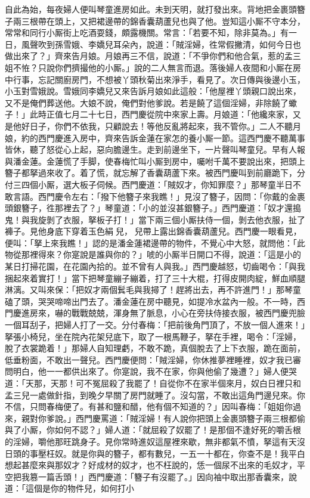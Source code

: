 自此為始，每夜婦人便叫琴童進房如此。未到天明，就打發出來。背地把金裹頭簪子兩三根帶在頭上，又把裙邊帶的錦香囊葫蘆兒也與了他。豈知這小厮不守本分，常常和同行小厮街上吃酒耍錢，頗露機關。常言：「若要不知，除非莫為。」有一日，風聲吹到孫雪娥、李嬌兒耳朵內，說道：「賊淫婦，徃常假撇清，如何今日也做出來了？」齊來告月娘。月娘再三不信，{}說道：「不爭你們和他合氣，惹的孟三姐不恠？只說你們擠撮他的小厮。」說的二人無言而退。落後婦人夜間和小厮在房中行事，忘記關廚房門，不想被丫頭秋菊出來淨手，看見了。次日傳與後邊小玉，小玉對雪娥說。雪娥同李嬌兒又來告訴月娘如此這般：「他屋裡丫頭親口說出來，又不是俺們葬送他。大娘不說，俺們對他爹說。若是饒了這個淫婦，非除饒了蠍子！」此時正值七月二十七日，西門慶從院中來家上壽。月娘道：「他纔來家，又是他好日子，你們不依我，只顧說去！等他反亂將起來，我不管你。」二人不聽月娘，約的西門慶進入房中，齊來告訴金蓮在家怎的養小厮一節。這西門慶不聽萬事皆休，聽了怒從心上起，惡向膽邊生。走到前邊坐下，一片聲叫琴童兒。早有人報與潘金蓮。金蓮慌了手脚，使春梅忙叫小厮到房中，囑咐千萬不要說出來，把頭上簪子都拏過來收了。着了慌，就忘解了香囊葫蘆下來。{}被西門慶叫到前廳跪下，分付三四個小厮，選大板子伺候。西門慶道：「賊奴才，你知罪麼？」那琴童半日不敢言語。西門慶令左右：「撥下他簪子來我瞧！」見沒了簪子，因問：「你戴的金裹頭銀簪子，徃那裡去了？」琴童道：「小的並沒甚銀簪子。」西門慶道：「奴才還搗鬼！與我旋剝了衣服，拏板子打！」當下兩三個小厮扶侍一個，剝去他衣服，扯了褲子。見他身底下穿着玉色絹𧜽兒，𧜽兒帶上露出錦香囊葫蘆兒。西門慶一眼看見，便叫：「拏上來我瞧！」認的是潘金蓮裙邊帶的物件，{}不覺心中大怒，就問他：「此物從那裡得來？你寔說是誰與你的？」唬的小厮半日開口不得，說道：「這是小的某日打掃花園，在花園內拾的。並不曾有人與我。」西門慶越怒，切齒喝令：「與我捆起來着實打！」當下把琴童繃子繃着，打了三十大棍，打得皮開肉綻，鮮血順腿淋漓。又叫來保：「把奴才兩個鬂毛與我撏了！趕將出去，再不許進門！」{}那琴童磕了頭，哭哭啼啼出門去了。潘金蓮在房中聽見，如提冷水盆內一般。不一時，西門慶進房來，嚇的戰戰兢兢，渾身無了脈息，小心在旁扶侍接衣服，被西門慶兜臉一個耳刮子，把婦人打了一交。分付春梅：「把前後角門頂了，不放一個人進來！」拏張小椅兒，坐在院內花架兒底下，取了一根馬鞭子，拏在手裡，喝令：「淫婦，脫了衣裳跪着！」那婦人自知理虧，不敢不跪，真個脫去了上下衣服，跪在面前，低垂粉面，不敢出一聲兒。{}西門慶便問：「賊淫婦，你休推夢裡睡裡，奴才我已審問明白，他一一都供出來了。你寔說，我不在家，你與他偷了幾遭？」婦人便哭道：「天那，天那！可不冤屈殺了我罷了！自從你不在家半個來月，奴白日裡只和孟三兒一處做針指，到晚夕早關了房門就睡了。沒勾當，不敢出這角門邊兒來。你不信，只問春梅便了。{}有甚和鹽和醋，他有個不知道的？」因叫春梅：「姐姐你過來，親對你爹說。」西門慶罵道：「賊淫婦！有人說你把頭上金裹頭簪子兩三根都偷與了小厮，你如何不認？」{}婦人道：「就屈殺了奴罷了！是那個不逢好死的嚼舌根的淫婦，嚼他那旺跳身子。見你常時進奴這屋裡來歇，無非都氣不憤，拏這有天沒日頭的事壓枉奴。就是你與的簪子，都有數兒，一五一十都在，你查不是！我平白想起甚麼來與那奴才？好成材的奴才，也不枉說的，恁一個尿不出來的毛奴才，{}平空把我篡一篇舌頭！」西門慶道：「簪子有沒罷了。」因向袖中取出那香囊來，說道：「這個是你的物件兒，如何打小